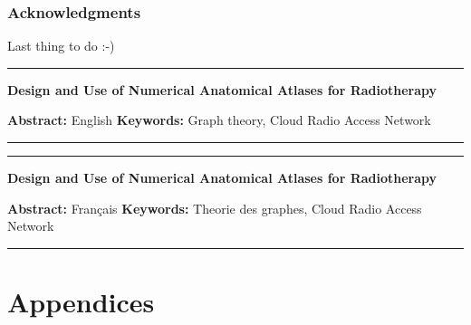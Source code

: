 \documentclass[a4paper,11pt,twoside]{ThesisStyle}
\begin{document}



\setcounter{page}{0}

\section*{Acknowledgments}

Last thing to do :-)
\begin{vcenterpage}
\noindent\rule[2pt]{\textwidth}{0.5pt}
\begin{center}
{\large\textbf{Design and Use of Numerical Anatomical Atlases for Radiotherapy\\}}
\end{center}
{\large\textbf{Abstract:}}
English
{\large\textbf{Keywords:}}
Graph theory, Cloud Radio Access Network
\\
\noindent\rule[2pt]{\textwidth}{0.5pt}
\end{vcenterpage}
\begin{vcenterpage}
\noindent\rule[2pt]{\textwidth}{0.5pt}
\begin{center}
{\large\textbf{Design and Use of Numerical Anatomical Atlases for Radiotherapy\\}}
\end{center}
{\large\textbf{Abstract:}}
Français
{\large\textbf{Keywords:}}
Theorie des graphes, Cloud Radio Access Network
\\
\noindent\rule[2pt]{\textwidth}{0.5pt}
\end{vcenterpage}
\dominitoc
\tableofcontents



\mainmatter










\appendix

\cleardoublepage
\mtcaddpart[Appendices]
\part*{Appendices}



%


\end{document}
